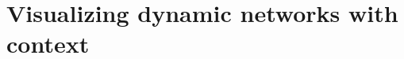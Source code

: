 \documentclass[12pt]{cmuthesis}
\begin{document}








\chapter{Visualizing dynamic networks with context}
\label{chapter:mapofjazz}
\end{document}
